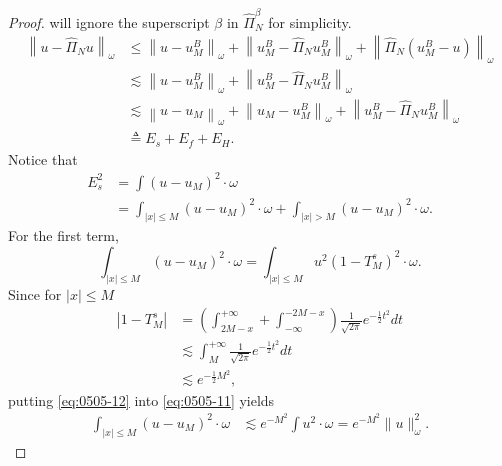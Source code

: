 \documentclass[pdflatex,sn-aps]{sn-jnl}%
\theoremstyle{thmstyleone}%
\theoremstyle{thmstyletwo}%
\theoremstyle{thmstylethree}%
\begin{document}
\begin{proof}
  will ignore the superscript $\beta$ in $\widehat{\Pi}_N^\beta$ for simplicity.
  \begin{equation}\label{eq:0505-9}
    \begin{aligned}
    \left\|u-\widehat{\Pi}_N u\right\|_\omega & \leqslant\left\|u-u_M^B\right\|_\omega+\left\|u_M^B-\widehat{\Pi}_N u_M^B\right\|_\omega+\left\|\widehat{\Pi}_N\left(u_M^B-u\right)\right\|_\omega \\
    & \lesssim\left\|u-u_M^B\right\|_\omega+\left\|u_M^B-\widehat{\Pi}_N u_M^B\right\|_\omega \\
    & \lesssim\left\|u-u_M\right\|_\omega+\left\|u_M-u_M^B\right\|_\omega+\left\|u_M^B-\widehat{\Pi}_N u_M^B\right\|_\omega \\
    & \triangleq E_s+E_f+E_H.
    \end{aligned}
  \end{equation}
  Notice that
  \begin{equation}\label{eq:0505-10}
    \begin{aligned}
    E_s^2 & =\int\left(u-u_M\right)^2 \cdot \omega \\
    & =\int_{|x| \leqslant M}\left(u-u_M\right)^2 \cdot \omega+\int_{|x|>M}\left(u-u_M\right)^2 \cdot \omega.
    \end{aligned}
  \end{equation}
  For the first term,
  \begin{equation}\label{eq:0505-11}
    \int_{|x| \leqslant M}(u-u_M)^2 \cdot \omega=\int_{|x| \leqslant M} u^2\left(1-T_M^s\right)^2 \cdot \omega.
  \end{equation}
  Since for $|x| \leqslant M$
  \begin{equation}\label{eq:0505-12}
    \begin{aligned}
    \left|1-T_M^s\right| & =\left(\int_{2 M-x}^{+\infty}+\int_{-\infty}^{-2 M-x}\right) \frac{1}{\sqrt{2 \pi}} e^{-\frac{1}{2} t^2} d t \\
    & \lesssim \int_M^{+\infty} \frac{1}{\sqrt{2 \pi}} e^{-\frac{1}{2} t^2} d t \\
    & \lesssim e^{-\frac{1}{2} M^2},
    \end{aligned}
  \end{equation}
  putting \eqref{eq:0505-12} into \eqref{eq:0505-11} yields
  \begin{equation}\label{eq:0505-13}
    \begin{aligned}
    \int_{|x| \leqslant M}\left(u-u_M\right)^2 \cdot \omega & \lesssim e^{-M^2} \int u^2 \cdot \omega =e^{-M^2}\|u\|_\omega^2.
    \end{aligned}

\end{equation}
\end{proof}
\end{document}
